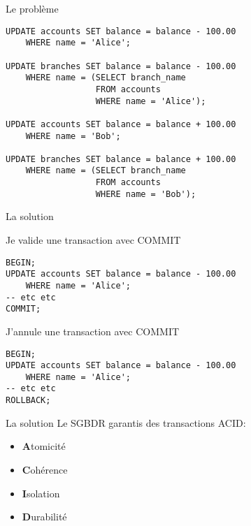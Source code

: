 \documentclass[xetex,dvipsnames]{beamer}
\begin{document}
\begin{frame}[fragile]{Le problème}
	\begin{verbatim}
UPDATE accounts SET balance = balance - 100.00
    WHERE name = 'Alice';
    
UPDATE branches SET balance = balance - 100.00
    WHERE name = (SELECT branch_name 
                  FROM accounts 
                  WHERE name = 'Alice');
                 
UPDATE accounts SET balance = balance + 100.00
    WHERE name = 'Bob';
    
UPDATE branches SET balance = balance + 100.00
    WHERE name = (SELECT branch_name 
                  FROM accounts 
                  WHERE name = 'Bob');
    \end{verbatim}
\end{frame}

\begin{frame}[fragile]{La solution}
\begin{block}{Je valide une transaction avec COMMIT}
	\begin{verbatim}
BEGIN;
UPDATE accounts SET balance = balance - 100.00
    WHERE name = 'Alice';
-- etc etc
COMMIT; 
    \end{verbatim}
\end{block}
\begin{alertblock}{J'annule une transaction avec COMMIT}
	\begin{verbatim}
BEGIN;
UPDATE accounts SET balance = balance - 100.00
    WHERE name = 'Alice';
-- etc etc
ROLLBACK; 
    \end{verbatim}    
\end{alertblock}    
    
\end{frame}

\begin{frame}[fragile]{La solution}
    Le SGBDR garantis des transactions ACID:
	\begin{itemize}
		\item \textbf{A}tomicité
		\item \textbf{C}ohérence
		\item \textbf{I}solation
		\item \textbf{D}urabilité
	\end{itemize}
    
\end{frame}
\end{document}
